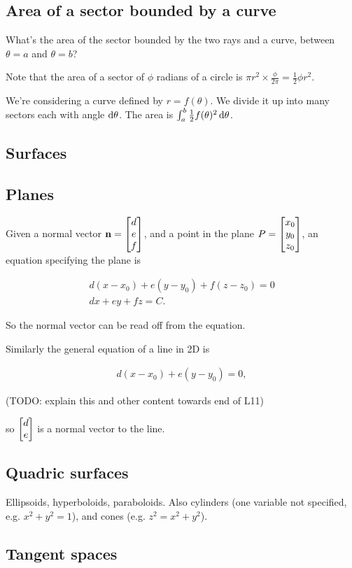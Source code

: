 \subsection*{Area of a sector bounded by a curve}

What's the area of the sector bounded by the two rays and a curve, between
$\theta=a$ and $\theta=b$?

Note that the area of a sector of $\phi$ radians of a circle is
$\pi r^2 \times \frac{\phi}{2\pi} = \frac{1}{2}\phi r^2$.

We're considering a curve defined by $r = f(\theta)$. We divide it up into many
sectors each with angle $\dtheta$. The area is
$\int_a^b \frac{1}{2}f(\theta)^2\dtheta$.

\subsection{Surfaces}

\subsection*{Planes}
Given a normal vector $\mathbf n = \begin{bmatrix}d\\e\\f\end{bmatrix}$, and a point in the plane
$P = \begin{bmatrix}x_0\\y_0\\z_0\end{bmatrix}$, an equation specifying the plane is

\begin{align*}
  d(x - x_0) + e(y - y_0) + f(z - z_0) = 0 \\
  dx + ey + fz = C.
\end{align*}

So the normal vector can be read off from the equation.

Similarly the general equation of a line in 2D is

\begin{align*}
  d(x - x_0) + e(y - y_0) = 0,
\end{align*}

(TODO: explain this and other content towards end of L11)

so $\begin{bmatrix}d\\e\end{bmatrix}$ is a normal vector to the line.


\subsection*{Quadric surfaces}
Ellipsoids, hyperboloids, paraboloids. Also cylinders (one variable not
specified, e.g. $x^2 + y^2 = 1$), and cones (e.g. $z^2 = x^2 + y^2$).

\subsection{Tangent spaces}

